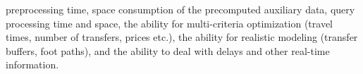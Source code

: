 preprocessing time, space consumption of the precomputed auxiliary data, query processing time and space, the ability for multi-criteria optimization (travel times, number of transfers, prices etc.), the ability for realistic modeling (transfer buffers, foot paths), and the ability to deal with delays and other real-time information.